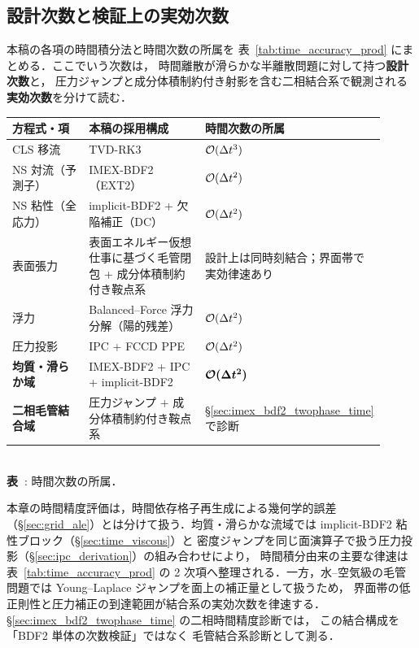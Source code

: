 \subsection{設計次数と検証上の実効次数}
\label{sec:time_accuracy_table}

本稿の各項の時間積分法と時間次数の所属を
表~\ref{tab:time_accuracy_prod} にまとめる．ここでいう次数は，
時間離散が滑らかな半離散問題に対して持つ\textbf{設計次数}と，
圧力ジャンプと成分体積制約付き射影を含む二相結合系で観測される
\textbf{実効次数}を分けて読む．

\begin{center}
\renewcommand{\arraystretch}{\PaperTableArrayStretch}
\begin{tabular}{@{}p{0.27\linewidth}p{0.39\linewidth}p{0.25\linewidth}@{}}
\hline
方程式・項 & 本稿の採用構成 & 時間次数の所属 \\
\hline
CLS 移流 & TVD-RK3 & $\mathcal{O}(\Delta t^3)$ \\
NS 対流（予測子）& IMEX-BDF2（EXT2）& $\mathcal{O}(\Delta t^2)$ \\
NS 粘性（全応力） & implicit-BDF2 + 欠陥補正（DC）& $\mathcal{O}(\Delta t^2)$ \\
表面張力 & 表面エネルギー仮想仕事に基づく毛管閉包 + 成分体積制約付き鞍点系 & 設計上は同時刻結合；界面帯で実効律速あり \\
浮力 & Balanced--Force 浮力分解（陽的残差）& $\mathcal{O}(\Delta t^2)$ \\
圧力投影 & IPC + FCCD PPE & $\mathcal{O}(\Delta t^2)$ \\
\hline
\textbf{均質・滑らか域}& IMEX-BDF2 + IPC + implicit-BDF2 & $\boldsymbol{\mathcal{O}(\Delta t^2)}$ \\
\textbf{二相毛管結合域}& 圧力ジャンプ + 成分体積制約付き鞍点系 & §\ref{sec:imex_bdf2_twophase_time} で診断 \\
\hline
\end{tabular}\\
\label{tab:time_accuracy_prod}\textbf{表~\thetable}: 時間次数の所属．
\end{center}

本章の時間精度評価は，時間依存格子再生成による幾何学的誤差
（§\ref{sec:grid_ale}）とは分けて扱う．均質・滑らかな流域では
implicit-BDF2 粘性ブロック（§\ref{sec:time_viscous}）と
密度ジャンプを同じ面演算子で扱う圧力投影（§\ref{sec:ipc_derivation}）の組み合わせにより，
時間積分由来の主要な律速は表~\ref{tab:time_accuracy_prod} の
2 次項へ整理される．一方，水--空気級の毛管問題では
Young--Laplace ジャンプを面上の補正量として扱うため，
界面帯の低正則性と圧力補正の到達範囲が結合系の実効次数を律速する．
§\ref{sec:imex_bdf2_twophase_time} の二相時間精度診断では，
この結合構成を「BDF2 単体の次数検証」ではなく
毛管結合系診断として測る．

